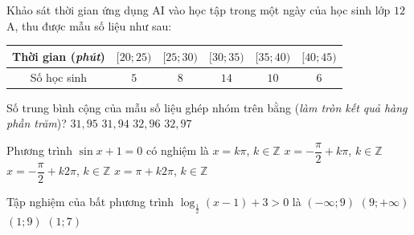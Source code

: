 \begin{ex}%
	Khảo sát thời gian ứng dụng AI vào học tập trong một ngày của học sinh lớp $12$A, thu được mẫu số liệu như sau:
	\begin{center}
		\begin{tabular}{|c|c|c|c|c|c|}
			\hline
			Thời gian (\textit{phút}) & $[20; 25)$ & $[25; 30)$ & $[30;35)$ & $[35;40)$ & $[40;45)$ \\
			\hline
			Số học sinh & $5$ & $8$ & $14$ & $10$ & $6$ \\
			\hline
		\end{tabular}
	\end{center}
	Số trung bình cộng của mẫu số liệu ghép nhóm trên bằng (\textit{làm tròn kết quả hàng phần trăm})?
	\choice
	{$31{,}95$}
	{$31{,}94$}
	{$32{,}96$}
	{\True $32{,}97$}
\end{ex}

\begin{ex}%
	Phương trình $\sin x+1=0$ có nghiệm là
	\choice
	{$x=k\pi$, $k \in \mathbb{Z}$}
	{$x=-\dfrac{\pi}{2}+k\pi$, $k \in \mathbb{Z}$}
	{\True $x=-\dfrac{\pi}{2}+k2\pi$, $k \in \mathbb{Z}$}
	{$x=\pi+k2\pi$, $k \in \mathbb{Z}$}
\end{ex}

\begin{ex}%
	Tập nghiệm của bất phương trình $\log_{\tfrac{1}{2}}(x-1)+3>0$ là
	\choice
	{$(-\infty;9)$}
	{$(9;+\infty)$}
	{\True $(1;9)$}
	{$(1;7)$}
\end{ex}

